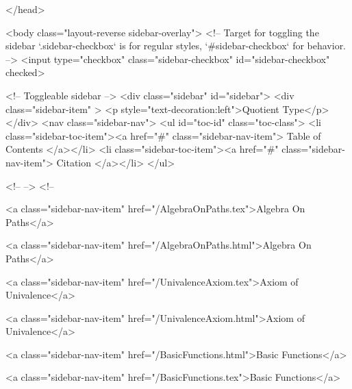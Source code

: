   
</head>




  <body class="layout-reverse sidebar-overlay">
    <!-- Target for toggling the sidebar `.sidebar-checkbox` is for regular
     styles, `#sidebar-checkbox` for behavior. -->
<input type="checkbox" class="sidebar-checkbox" id="sidebar-checkbox" checked>

<!-- Toggleable sidebar -->
<div class="sidebar" id="sidebar">
  <div class="sidebar-item" >
    <p style="text-decoration:left">Quotient Type</p>
  </div>
  <nav class="sidebar-nav">
    <ul id="toc-id" class="toc-class">
  <li class="sidebar-toc-item"><a href="#" class="sidebar-nav-item"> Table of Contents </a></li>
  <li class="sidebar-toc-item"><a href="#" class="sidebar-nav-item"> Citation </a></li>
</ul>


    <!--  -->
    <!-- 
      
    
      
    
      
    
      
        
      
    
      
        
          <a class="sidebar-nav-item" href="/AlgebraOnPaths.tex">Algebra On Paths</a>
        
      
    
      
        
          <a class="sidebar-nav-item" href="/AlgebraOnPaths.html">Algebra On Paths</a>
        
      
    
      
        
          <a class="sidebar-nav-item" href="/UnivalenceAxiom.tex">Axiom of Univalence</a>
        
      
    
      
        
          <a class="sidebar-nav-item" href="/UnivalenceAxiom.html">Axiom of Univalence</a>
        
      
    
      
        
          <a class="sidebar-nav-item" href="/BasicFunctions.html">Basic Functions</a>
        
      
    
      
        
          <a class="sidebar-nav-item" href="/BasicFunctions.tex">Basic Functions</a>
        
      
    

